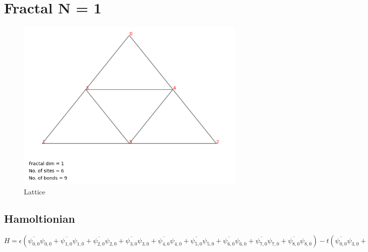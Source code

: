 \documentclass[11pt]{article}
\begin{document}
    \section{Fractal N = 1}
    \begin{figure}[h!]
      \centering
      \includegraphics[scale=0.7]{output//N=1//N=1_lattice.png}
      \caption{Lattice}
    \end{figure}
    
    \subsection{Hamoltionian}
    $H=\epsilon \left(\overline{\psi_{0, 0}} \psi_{0, 0} + \overline{\psi_{1, 0}} \psi_{1, 0} + \overline{\psi_{2, 0}} \psi_{2, 0} + \overline{\psi_{3, 0}} \psi_{3, 0} + \overline{\psi_{4, 0}} \psi_{4, 0} + \overline{\psi_{5, 0}} \psi_{5, 0} + \overline{\psi_{6, 0}} \psi_{6, 0} + \overline{\psi_{7, 0}} \psi_{7, 0} + \overline{\psi_{8, 0}} \psi_{8, 0}\right) - t \left(\overline{\psi_{0, 0}} \psi_{3, 0} + \overline{\psi_{0, 0}} \psi_{4, 0} + \overline{\psi_{1, 0}} \psi_{3, 0} + \overline{\psi_{1, 0}} \psi_{5, 0} + \overline{\psi_{2, 0}} \psi_{4, 0} + \overline{\psi_{2, 0}} \psi_{5, 0} + \overline{\psi_{3, 0}} \psi_{0, 0} + \overline{\psi_{3, 0}} \psi_{1, 0} + \overline{\psi_{3, 0}} \psi_{4, 0} + \overline{\psi_{3, 0}} \psi_{5, 0} + \overline{\psi_{4, 0}} \psi_{0, 0} + \overline{\psi_{4, 0}} \psi_{2, 0} + \overline{\psi_{4, 0}} \psi_{3, 0} + \overline{\psi_{4, 0}} \psi_{5, 0} + \overline{\psi_{5, 0}} \psi_{1, 0} + \overline{\psi_{5, 0}} \psi_{2, 0} + \overline{\psi_{5, 0}} \psi_{3, 0} + \overline{\psi_{5, 0}} \psi_{4, 0}\right)$
\end{document}
